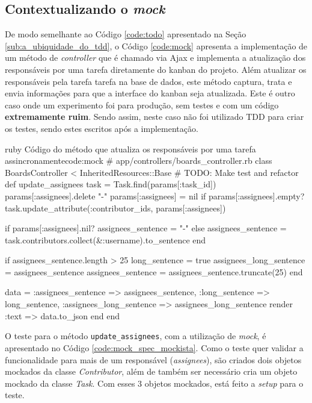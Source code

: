 \subsection{Contextualizando o \textit{mock}}
\label{sub:contextualizando_o_mock}

De modo semelhante ao Código \ref{code:todo} apresentado na Seção \ref{sub:a_ubiquidade_do_tdd}, o Código \ref{code:mock} apresenta a implementação de um método de \textit{controller} que é chamado via Ajax e implementa a atualização dos responsáveis por uma tarefa diretamente do kanban do projeto. Além atualizar os responsáveis pela tarefa tarefa na base de dados, este método captura, trata e envia informações para que a interface do kanban seja atualizada. Este é outro caso onde um experimento foi para produção, sem testes e com um código \textbf{extremamente ruim}. Sendo assim, neste caso não foi utilizado TDD para criar os testes, sendo estes escritos após a implementação.

\begin{mycode}{ruby}%
{Código do método que atualiza os responsáveis por uma tarefa assincronamente}{code:mock}
# app/controllers/boards_controller.rb
class BoardsController < InheritedResources::Base
  # TODO: Make test and refactor
  def update_assignees
    task = Task.find(params[:task_id])
    params[:assignees].delete "-"
    params[:assignees] = nil if params[:assignees].empty?
    task.update_attribute(:contributor_ids, params[:assignees])

    if params[:assignees].nil?
      assignees_sentence = "-"
    else
      assignees_sentence = task.contributors.collect(&:username).to_sentence
    end

    if assignees_sentence.length > 25
      long_sentence = true
      assignees_long_sentence = assignees_sentence
      assignees_sentence = assignees_sentence.truncate(25)
    end

    data = { :assignees_sentence => assignees_sentence,
             :long_sentence => long_sentence,
             :assignees_long_sentence => assignees_long_sentence }
    render :text => data.to_json
  end
end
\end{mycode}

O teste para o método \texttt{update\_assignees}, com a utilização de \textit{mock}, é apresentado no Código \ref{code:mock_spec_mockista}. Como o teste quer validar a funcionalidade para mais de um responsável (\textit{assignees}), são criados dois objetos mockados da classe \textit{Contributor}, além de também ser necessário cria um objeto mockado da classe \textit{Task}. Com esses 3 objetos mockados, está feito a \textit{setup} para o teste.

